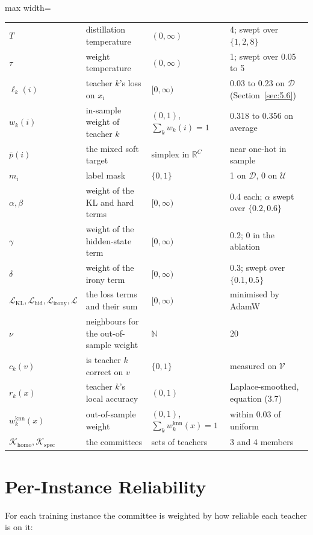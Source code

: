 \begin{table}[htbp]
\begin{adjustbox}{max width=\textwidth}
\begin{tabular}{llll}
$T$ & distillation temperature & $(0, \infty)$ & 4; swept over $\{1, 2, 8\}$ \\
$\tau$ & weight temperature & $(0, \infty)$ & 1; swept over 0.05 to 5 \\
$\ell_k(i)$ & teacher $k$'s loss on $x_i$ & $[0, \infty)$ & 0.03 to 0.23 on $\mathcal{D}$ (Section~\ref{sec:5.6}) \\
$w_k(i)$ & in-sample weight of teacher $k$ & $(0,1)$, $\sum_k w_k(i) = 1$ & 0.318 to 0.356 on average \\
$\bar p(i)$ & the mixed soft target & simplex in $\mathbb{R}^C$ & near one-hot in sample \\
$m_i$ & label mask & $\{0, 1\}$ & 1 on $\mathcal{D}$, 0 on $\mathcal{U}$ \\
$\alpha, \beta$ & weight of the KL and hard terms & $[0, \infty)$ & 0.4 each; $\alpha$ swept over $\{0.2, 0.6\}$ \\
$\gamma$ & weight of the hidden-state term & $[0, \infty)$ & 0.2; 0 in the ablation \\
$\delta$ & weight of the irony term & $[0, \infty)$ & 0.3; swept over $\{0.1, 0.5\}$ \\
$\mathcal{L}_{\mathrm{KL}}, \mathcal{L}_{\mathrm{hid}}, \mathcal{L}_{\mathrm{irony}}, \mathcal{L}$ & the loss terms and their sum & $[0, \infty)$ & minimised by AdamW \\
$\nu$ & neighbours for the out-of-sample weight & $\mathbb{N}$ & 20 \\
$c_k(v)$ & is teacher $k$ correct on $v$ & $\{0, 1\}$ & measured on $\mathcal{V}$ \\
$r_k(x)$ & teacher $k$'s local accuracy & $(0, 1)$ & Laplace-smoothed, equation (3.7) \\
$w_k^{\mathrm{knn}}(x)$ & out-of-sample weight & $(0,1)$, $\sum_k w_k^{\mathrm{knn}}(x) = 1$ & within 0.03 of uniform \\
$\mathcal{K}_{\mathrm{homo}}, \mathcal{K}_{\mathrm{spec}}$ & the committees & sets of teachers & 3 and 4 members \\
\bottomrule
\end{tabular}
\end{adjustbox}
\end{table}

\section{Per-Instance Reliability}
\label{sec:3.2}
For each training instance the committee is weighted by how reliable each teacher is on it:

